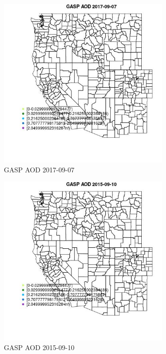 \begin{figure} 
\centering  
\includegraphics[width=0.77\textwidth]{Code_Outputs/Report_ML_input_PM25_Step4_part_e_de_duplicated_aves_compiled_2019-05-21wNAs_MapObsGASP_AOD2017-09-07.jpg} 
\caption{\label{fig:Report_ML_input_PM25_Step4_part_e_de_duplicated_aves_compiled_2019-05-21wNAsMapObsGASP_AOD2017-09-07}GASP AOD 2017-09-07} 
\end{figure} 
 

\clearpage 

\begin{figure} 
\centering  
\includegraphics[width=0.77\textwidth]{Code_Outputs/Report_ML_input_PM25_Step4_part_e_de_duplicated_aves_compiled_2019-05-21wNAs_MapObsGASP_AOD2015-09-10.jpg} 
\caption{\label{fig:Report_ML_input_PM25_Step4_part_e_de_duplicated_aves_compiled_2019-05-21wNAsMapObsGASP_AOD2015-09-10}GASP AOD 2015-09-10} 
\end{figure} 
 

